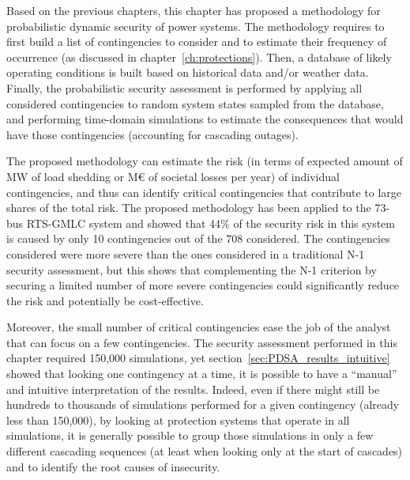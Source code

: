 Based on the previous chapters, this chapter has proposed a methodology for probabilistic dynamic security of power systems. The methodology requires to first build a list of contingencies to consider and to estimate their frequency of occurrence (as discussed in chapter~\ref{ch:protections}). Then, a database of likely operating conditions is built based on historical data and/or weather data. Finally, the probabilistic security assessment is performed by applying all considered contingencies to random system states sampled from the database, and performing time-domain simulations to estimate the consequences that would have those contingencies (accounting for cascading outages).

The proposed methodology can estimate the risk (\eg in terms of expected amount of MW of load shedding or M€ of societal losses per year) of individual contingencies, and thus can identify critical contingencies that contribute to large shares of the total risk. The proposed methodology has been applied to the 73-bus RTS-GMLC system and showed that 44\% of the security risk in this system is caused by only 10 contingencies out of the 708 considered. The contingencies considered were more severe than the ones considered in a traditional N-1 security assessment, but this shows that complementing the N-1 criterion by securing a limited number of more severe contingencies could significantly reduce the risk and potentially be cost-effective.

Moreover, the small number of critical contingencies ease the job of the analyst that can focus on a few contingencies. The security assessment performed in this chapter required 150,000 simulations, yet section~\ref{sec:PDSA_results_intuitive} showed that looking one contingency at a time, it is possible to have a ``manual'' and intuitive interpretation of the results. Indeed, even if there might still be hundreds to thousands of simulations performed for a given contingency (already less than 150,000), by looking at protection systems that operate in all simulations, it is generally possible to group those simulations in only a few different cascading sequences (at least when looking only at the start of cascades) and to identify the root causes of insecurity.

